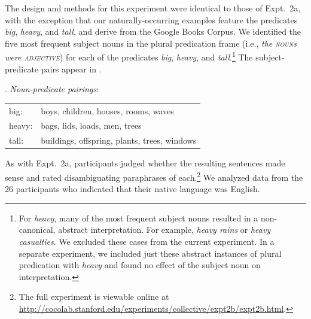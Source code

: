 \documentclass[linguex]{sp}
\begin{document}
The design and methods for this experiment were identical to those of Expt.~2a, with the exception that our naturally-occurring examples feature the predicates \emph{big}, \emph{heavy}, and \emph{tall}, and derive from the Google Books Corpus. We identified the five most frequent subject nouns in the plural predication frame (i.e., \emph{the \textsc{noun}s were \textsc{adjective}}) for each of the predicates \emph{big}, \emph{heavy}, and \emph{tall}.\footnote{For \emph{heavy}, many of the most frequent subject nouns resulted in a non-canonical, abstract interpretation. For example, \emph{heavy rains} or \emph{heavy casualties}. We excluded these cases from the current experiment. In a separate experiment, we included just these abstract instances of plural predication with \emph{heavy} and found no effect of the subject noun on interpretation.} The subject-predicate pairs appear in \Next.

\ex. \emph{Noun-predicate pairings}:\\[2pt]
\begin{tabular}{ll}
big:& boys, children, houses, rooms, waves\\
heavy:& bags, lids, loads, men, trees\\
tall:& buildings, offspring, plants, trees, windows
\end{tabular}	

As with Expt.~2a, participants judged whether the resulting sentences made sense and rated disambiguating paraphrases of each.\footnote{The full experiment is viewable online at \url{http://cocolab.stanford.edu/experiments/collective/expt2b/expt2b.html}.}  We analyzed data from the 26 participants who indicated that their native language was English.
\end{document}
